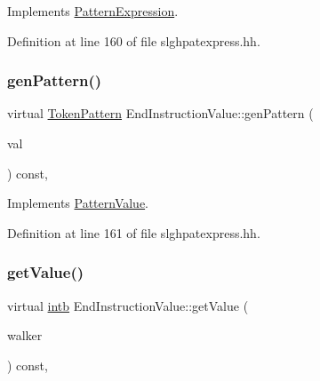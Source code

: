 Implements \mbox{\hyperlink{class_pattern_expression_a1dc2d0c07f64fdab9da6c0849e992b50}{Pattern\+Expression}}.



Definition at line 160 of file slghpatexpress.\+hh.

\mbox{\label{class_end_instruction_value_a8a4ae4571a25a17accdf7260e1412b44}} 
\subsubsection{\texorpdfstring{genPattern()}{genPattern()}}
{\footnotesize\ttfamily virtual \mbox{\hyperlink{class_token_pattern}{Token\+Pattern}} End\+Instruction\+Value\+::gen\+Pattern (\begin{DoxyParamCaption}\item[{\mbox{\hyperlink{types_8h_aa925ba3e627c2df89d5b1cfe84fb8572}{intb}}}]{val }\end{DoxyParamCaption}) const\hspace{0.3cm}{\ttfamily [inline]}, {\ttfamily [virtual]}}



Implements \mbox{\hyperlink{class_pattern_value_acc5a0c3b740a93e6ed5d3882c960ef98}{Pattern\+Value}}.



Definition at line 161 of file slghpatexpress.\+hh.

\mbox{\label{class_end_instruction_value_ab5a3514129e205fe42efa1dba471e496}} 
\subsubsection{\texorpdfstring{getValue()}{getValue()}}
{\footnotesize\ttfamily virtual \mbox{\hyperlink{types_8h_aa925ba3e627c2df89d5b1cfe84fb8572}{intb}} End\+Instruction\+Value\+::get\+Value (\begin{DoxyParamCaption}\item[{\mbox{\hyperlink{class_parser_walker}{Parser\+Walker}} \&}]{walker }\end{DoxyParamCaption}) const\hspace{0.3cm}{\ttfamily [inline]}, {\ttfamily [virtual]}}



